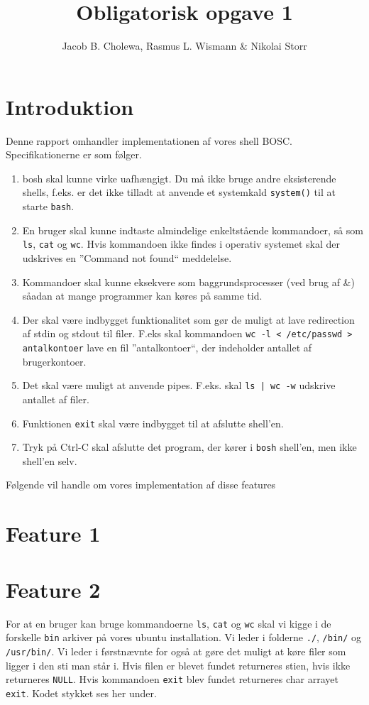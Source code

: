\documentclass[danish]{report}
\title{Obligatorisk opgave 1}
\author{Jacob B. Cholewa, Rasmus L. Wismann \& Nikolai Storr }
\begin{document}
\maketitle


\section{Introduktion}
Denne rapport omhandler implementationen af vores shell BOSC. Specifikationerne er som følger.

\begin{enumerate}
\item bosh skal kunne virke uafhængigt. Du må ikke bruge andre eksisterende shells, f.eks. er det ikke tilladt at anvende et systemkald {\tt system()} til at starte {\tt bash}.
\item En bruger skal kunne indtaste almindelige enkeltstående kommandoer, så som {\tt ls}, {\tt cat} og {\tt wc}. Hvis kommandoen ikke findes i operativ systemet skal der udskrives en ”Command not found“ meddelelse.
\item Kommandoer skal kunne eksekvere som baggrundsprocesser (ved brug af \&) såadan at mange programmer kan køres på samme tid.
\item Der skal være indbygget funktionalitet som gør de muligt at lave redirection af stdin og stdout til filer. F.eks skal kommandoen {\tt wc -l < /etc/passwd > antalkontoer} lave en fil ”antalkontoer“, der indeholder antallet af brugerkontoer.
\item Det skal være muligt at anvende pipes. F.eks. skal {\tt ls | wc -w} udskrive antallet af filer.
\item Funktionen {\tt exit} skal være indbygget til at afslutte shell’en.
\item Tryk på Ctrl-C skal afslutte det program, der kører i {\tt bosh} shell’en, men ikke shell’en selv.
\end{enumerate}

Følgende vil handle om vores implementation af disse features 

\section{Feature 1}
\section{Feature 2}

For at en bruger kan bruge kommandoerne {\tt ls}, {\tt cat} og {\tt wc} skal vi kigge i de forskelle {\tt bin} arkiver på vores ubuntu installation. Vi leder i folderne {\tt ./}, {\tt /bin/} og {\tt /usr/bin/}. Vi leder i førstnævnte for også at gøre det muligt at køre filer som ligger i den sti man står i. Hvis filen er blevet fundet returneres stien, hvis ikke returneres {\tt NULL}. Hvis kommandoen {\tt exit} blev fundet returneres char arrayet {\tt exit}. Kodet stykket ses her under.
\end{document}
